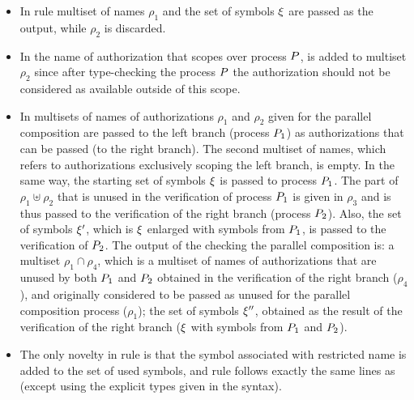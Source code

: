 \begin{itemize}
\item 
In rule  multiset of names $\rho_1$ and the set of symbols $\xi$ 
are passed as the output, while $\rho_2$ is discarded. 
\item 
In  the name of authorization that scopes over process $P$,
 is added to multiset $\rho_2$ since after type-checking the process $P$ the 
authorization should not be considered as available outside of this scope.
\item 
In  multisets of names of authorizations $\rho_1$ and $\rho_2$ given for the parallel composition
are passed to the left branch (process $P_1$) as authorizations that can 
be passed (to the right branch). The second multiset of names, which refers to authorizations exclusively scoping  the left branch, is empty. 
In the same way, the starting set of symbols $\xi$ is passed to process $P_1$.
The part of $\rho_1\uplus\rho_2$ that is unused in the verification of process $P_1$
is given in $\rho_3$ and is thus passed to the verification of the right branch (process $P_2$). 
Also, the set of symbols $\xi'$, which is $\xi$ enlarged with symbols from $P_1$, is passed to the verification of $P_2$.
The output of the checking the parallel composition is: 
a multiset $\rho_1\cap\rho_4$, which is a multiset of names of authorizations that are unused 
by both $P_1$ and $P_2$ obtained in the verification of the right branch ($\rho_4$), and originally considered to be passed as unused for the parallel composition process ($\rho_1$); the 
set of symbols $\xi''$, obtained as the result of the verification of the right branch ($\xi$ with symbols from $P_1$ and $P_2$). 
\item 
The only novelty in rule  is that the symbol associated with restricted name is added to the set of used symbols, and rule  follows exactly the same lines as  (except using the explicit types given in the syntax).
\end{itemize}
 
